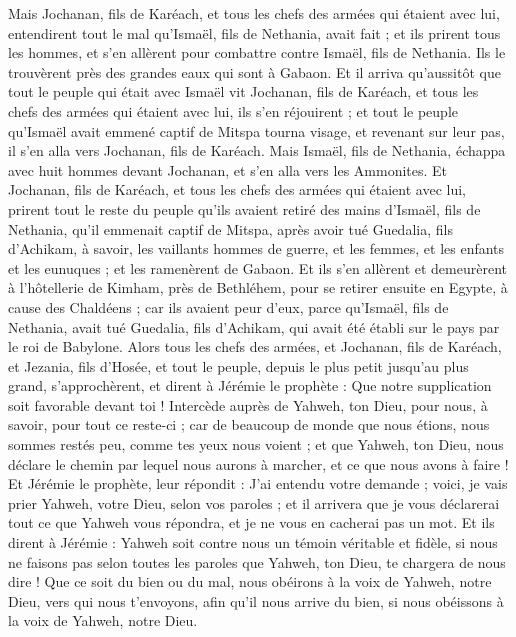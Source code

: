 \begin{multicols}{2}
Mais Jochanan, fils de Karéach, et tous les chefs des armées qui étaient avec lui, entendirent tout le mal qu'Ismaël, fils de Nethania, avait fait ;
et ils prirent tous les hommes, et s'en allèrent pour combattre contre Ismaël, fils de Nethania. Ils le trouvèrent près des grandes eaux qui sont à Gabaon.
Et il arriva qu'aussitôt que tout le peuple qui était avec Ismaël vit Jochanan, fils de Karéach, et tous les chefs des armées qui étaient avec lui, ils s'en réjouirent ;
et tout le peuple qu'Ismaël avait emmené captif de Mitspa tourna visage, et revenant sur leur pas, il s'en alla vers Jochanan, fils de Karéach.
Mais Ismaël, fils de Nethania, échappa avec huit hommes devant Jochanan, et s'en alla vers les Ammonites.
Et Jochanan, fils de Karéach, et tous les chefs des armées qui étaient avec lui, prirent tout le reste du peuple qu'ils avaient retiré des mains d'Ismaël, fils de Nethania, qu'il emmenait captif de Mitspa, après avoir tué Guedalia, fils d'Achikam, à savoir, les vaillants hommes de guerre, et les femmes, et les enfants et les eunuques ; et les ramenèrent de Gabaon.
Et ils s'en allèrent et demeurèrent à l'hôtellerie de Kimham, près de Bethléhem, pour se retirer ensuite en Egypte,
à cause des Chaldéens ; car ils avaient peur d'eux, parce qu'Ismaël, fils de Nethania, avait tué Guedalia, fils d'Achikam, qui avait été établi sur le pays par le roi de Babylone.
\VerseOne{}Alors tous les chefs des armées, et Jochanan, fils de Karéach, et Jezania, fils d'Hosée, et tout le peuple, depuis le plus petit jusqu'au plus grand, s'approchèrent,
et dirent à Jérémie le prophète : Que notre supplication soit favorable devant toi ! Intercède auprès de Yahweh, ton Dieu, pour nous, à savoir, pour tout ce reste-ci ; car de beaucoup de monde que nous étions, nous sommes restés peu, comme tes yeux nous voient ;
et que Yahweh, ton Dieu, nous déclare le chemin par lequel nous aurons à marcher, et ce que nous avons à faire !
Et Jérémie le prophète, leur répondit : J'ai entendu votre demande ; voici, je vais prier Yahweh, votre Dieu, selon vos paroles ; et il arrivera que je vous déclarerai tout ce que Yahweh vous répondra, et je ne vous en cacherai pas un mot.
Et ils dirent à Jérémie : Yahweh soit contre nous un témoin véritable et fidèle, si nous ne faisons pas selon toutes les paroles que Yahweh, ton Dieu, te chargera de nous dire !
Que ce soit du bien ou du mal, nous obéirons à la voix de Yahweh, notre Dieu, vers qui nous t'envoyons, afin qu'il nous arrive du bien, si nous obéissons à la voix de Yahweh, notre Dieu.

\end{multicols}
